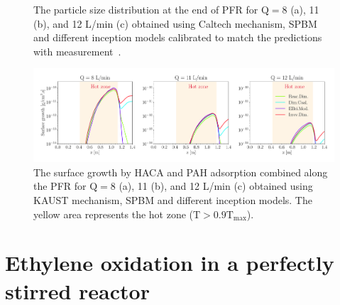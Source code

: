 \begin{figure}[H]
	\centering
	\caption{The particle size distribution at the end of PFR for $\mathrm{Q}=8$ (a), 11 (b), and 12 L/min (c) obtained using Caltech mechanism, SPBM and different inception models calibrated to match the predictions with measurement~\citep{mei2019quantitative}.}
	\label{fig:pfr_psd_caltech} 
\end{figure}


\begin{figure}[H]
	\centering
	\includegraphics[width=1\textwidth]{Figures/Results/PFR/surface_growth.pdf}
	\caption{The surface growth by HACA and PAH adsorption combined along the PFR for $\mathrm{Q}=8$ (a), 11 (b), and 12 L/min (c) obtained using KAUST mechanism, SPBM and different inception models. The yellow area represents the hot zone ($\mathrm{T}>0.9\mathrm{T_{max}}$).}
	\label{fig:pfr_surfacegrowth} 
\end{figure}



\section{Ethylene oxidation in a perfectly stirred reactor}


